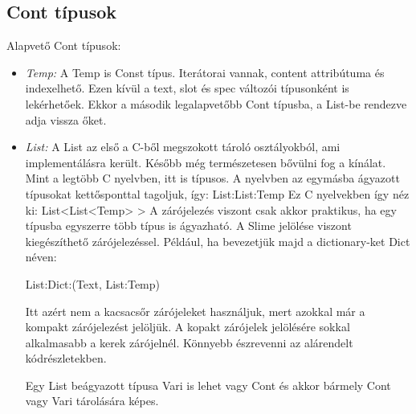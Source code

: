 \subsection{Cont típusok}

Alapvető Cont típusok:
\begin{itemize}
\item \emph{Temp:} 
A Temp is Const típus. 
Iterátorai vannak, content attribútuma és indexelhető.
Ezen kívül a text, slot és spec változói típusonként is lekérhetőek.
Ekkor a második legalapvetőbb Cont típusba, a List-be rendezve adja vissza őket.
\item \emph{List:} 
A List az első a C-ből megszokott tároló osztályokból, ami implementálásra került.
Később még természetesen bővülni fog a kínálat.
Mint a legtöbb C nyelvben, itt is típusos.
A nyelvben az egymásba ágyazott típusokat kettősponttal tagoljuk, így: List:List:Temp
Ez C nyelvekben így néz ki: List<List<Temp> >
A zárójelezés viszont csak akkor praktikus, ha egy típusba egyszerre több típus is ágyazható. 
A Slime jelölése viszont kiegészíthető zárójelezéssel. 
Például, ha bevezetjük majd a dictionary-ket Dict néven:

List:Dict:(Text, List:Temp)

Itt azért nem a kacsacsőr zárójeleket használjuk, mert azokkal már a kompakt zárójelezést jelöljük.
A kopakt zárójelek jelölésére sokkal alkalmasabb a kerek zárójelnél. 
Könnyebb észrevenni az alárendelt kódrészletekben.

Egy List beágyazott típusa Vari is lehet vagy Cont és akkor bármely Cont vagy Vari tárolására képes.


\end{itemize}
